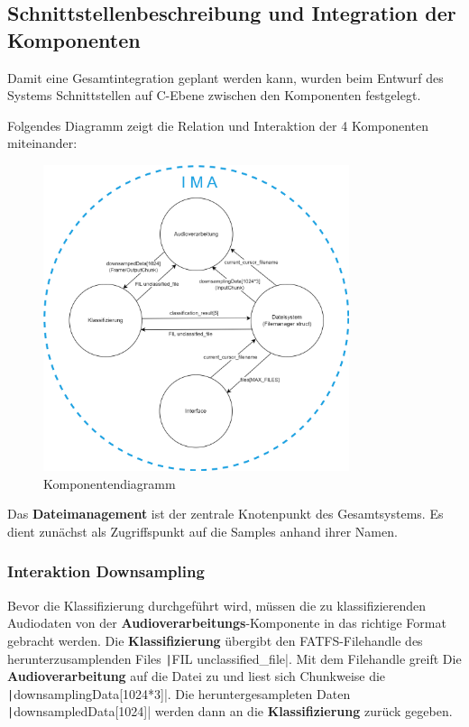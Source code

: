 \newpage

\subsection{Schnittstellenbeschreibung und Integration der Komponenten}

Damit eine Gesamtintegration geplant werden kann, wurden beim Entwurf des Systems Schnittstellen auf C-Ebene zwischen den Komponenten festgelegt.

Folgendes Diagramm zeigt die Relation und Interaktion der 4 Komponenten miteinander:


\begin{figure}[H]
   	\centering
   	\includegraphics[width=0.8\textwidth]{images/04_spezifikation/komponentendiagramm.drawio.png}
   	\caption{Komponentendiagramm}
   	\label{fig:komponentendiagramm}
\end{figure}

Das \textbf{Dateimanagement} ist der zentrale Knotenpunkt des Gesamtsystems. Es dient zunächst als Zugriffspunkt auf die Samples anhand ihrer Namen. 

\subsubsection{Interaktion Downsampling} 

Bevor die Klassifizierung durchgeführt wird, müssen die zu klassifizierenden Audiodaten von der \textbf{Audioverarbeitungs}-Komponente in das richtige Format gebracht werden.
Die \textbf{Klassifizierung} übergibt den FATFS-Filehandle des herunterzusamplenden Files \texttt|FIL unclassified_file|. Mit dem Filehandle greift Die \textbf{Audioverarbeitung} auf die Datei zu und liest sich Chunkweise die \texttt|downsamplingData[1024*3]|. Die heruntergesampleten Daten \texttt|downsampledData[1024]| werden dann an die \textbf{Klassifizierung} zurück gegeben.

